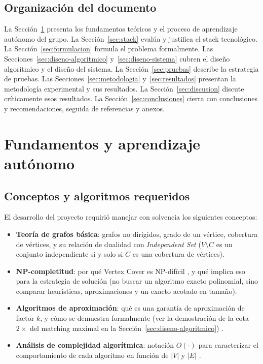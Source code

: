 \documentclass[11pt,a4paper]{article}
\begin{document}
\subsection{Organización del documento}
La Sección~\ref{sec:fundamentos} presenta los fundamentos teóricos y el proceso de
aprendizaje autónomo del grupo. La Sección~\ref{sec:stack} evalúa y justifica el stack
tecnológico. La Sección~\ref{sec:formulacion} formula el problema formalmente. Las
Secciones~\ref{sec:diseno-algoritmico} y~\ref{sec:diseno-sistema} cubren el diseño
algorítmico y el diseño del sistema. La Sección~\ref{sec:pruebas} describe la estrategia de
pruebas. Las Secciones~\ref{sec:metodologia} y~\ref{sec:resultados} presentan la
metodología experimental y sus resultados. La Sección~\ref{sec:discusion} discute
críticamente esos resultados. La Sección~\ref{sec:conclusiones} cierra con conclusiones y
recomendaciones, seguida de referencias y anexos.

\section{Fundamentos y aprendizaje autónomo}
\label{sec:fundamentos}

\subsection{Conceptos y algoritmos requeridos}
El desarrollo del proyecto requirió manejar con solvencia los siguientes conceptos:
\begin{itemize}
	\item \textbf{Teoría de grafos básica}: grafos no dirigidos, grado de un vértice,
	cobertura de vértices, y su relación de dualidad con \emph{Independent Set}
	($V \setminus C$ es un conjunto independiente si y solo si $C$ es una cobertura de
	vértices).
	\item \textbf{NP-completitud}: por qué Vertex Cover es NP-difícil \cite{karp1972}, y qué
	implica eso para la estrategia de solución (no buscar un algoritmo exacto polinomial,
	sino comparar heurísticas, aproximaciones y un exacto acotado en tamaño).
	\item \textbf{Algoritmos de aproximación}: qué es una garantía de aproximación de
	factor $k$, y cómo se demuestra formalmente (ver la demostración de la cota $2\times$ del
	matching maximal en la Sección~\ref{sec:diseno-algoritmico}) \cite{vazirani2003}.
	\item \textbf{Análisis de complejidad algorítmica}: notación $O(\cdot)$ para caracterizar
	el comportamiento de cada algoritmo en función de $|V|$ y $|E|$ \cite{clrs2009}.
\end{itemize}
\end{document}
